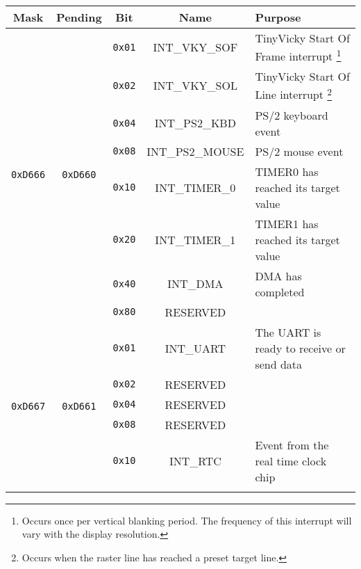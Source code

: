 \begin{table}[ht]
	\begin{center}
		\begin{tabular}{| c | c | c | c | l |} \hline
            Mask & Pending & Bit & Name & Purpose \\ \hline\hline

            \multirow{8}{*}{{\tt 0xD666}} & \multirow{8}{*}{{\tt 0xD660}} & \verb+0x01+ & INT\_VKY\_SOF & TinyVicky Start Of Frame interrupt
			\footnote{Occurs once per vertical blanking period. The frequency of this interrupt will vary with the display resolution.} \\ \cline{3-5}

            & & \verb+0x02+ & INT\_VKY\_SOL & TinyVicky Start Of Line interrupt
			\footnote{Occurs when the raster line has reached a preset target line.} \\ \cline{3-5}

            & & \verb+0x04+ & INT\_PS2\_KBD & PS/2 keyboard event \\ \cline{3-5}

            & & \verb+0x08+ & INT\_PS2\_MOUSE & PS/2 mouse event \\ \cline{3-5}

            & & \verb+0x10+ & INT\_TIMER\_0 & TIMER0 has reached its target value \\ \cline{3-5}

            & & \verb+0x20+ & INT\_TIMER\_1 & TIMER1 has reached its target value \\ \cline{3-5}

            & & \verb+0x40+ & INT\_DMA & DMA has completed \\ \cline{3-5}

            & & \verb+0x80+ & RESERVED & \\ \hline

            \multirow{8}{*}{{\tt 0xD667}} & \multirow{8}{*}{{\tt 0xD661}} & \verb+0x01+ & INT\_UART & The UART is ready to receive or send data \\ \cline{3-5}

            & & \verb+0x02+ & RESERVED & \\ \cline{3-5}

            & & \verb+0x04+ & RESERVED & \\ \cline{3-5}

            & & \verb+0x08+ & RESERVED & \\ \cline{3-5}

            & & \verb+0x10+ & INT\_RTC & Event from the real time clock chip \\ \cline{3-5}


\end{tabular}
\end{center}
\end{table}

